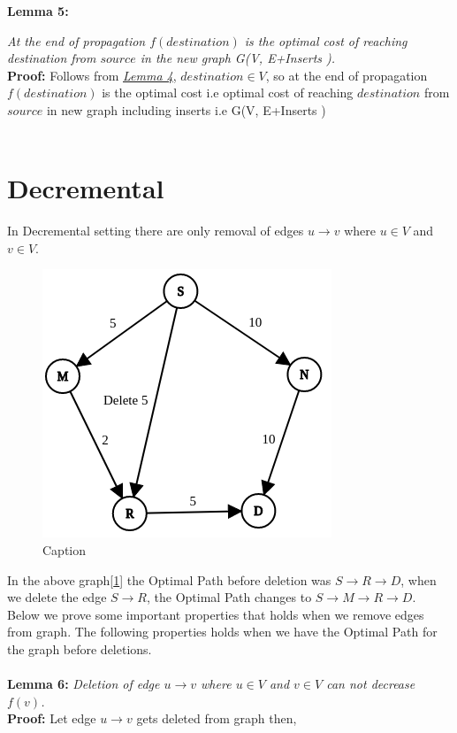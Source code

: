\documentclass[a4paper]{article}
\begin{document}
\hypertarget{Lemma 5}{\textbf{Lemma 5:}}\textit{At the end of propagation $f(destination)$ is the optimal cost of reaching destination from $source$ in the new graph G(V, E+Inserts ).}\\
\textbf{Proof:} Follows from \hyperlink{Lemma 4}{\textit{Lemma 4}}, $destination \in V$, so at the end of propagation $f(destination)$ is the optimal cost i.e optimal cost of reaching $destination$ from $source$ in new graph including inserts i.e G(V, E+Inserts )\\
\\
\section{Decremental}
In Decremental setting there are only removal of edges $u \rightarrow v$ where $u \in V$ and $v \in V$.
\begin{figure}[H]
    \centering
    \includegraphics[scale=0.4]{img/Delete2.png}
    \caption{Caption}
    \label{fig:delete_sample}
\end{figure}
In the above graph[\ref{fig:delete_sample}] the Optimal Path before deletion was $S \rightarrow R \rightarrow D$, when we delete the edge $S \rightarrow R$, the Optimal Path changes to $S \rightarrow M \rightarrow R \rightarrow D$.\\
Below we prove some important properties that holds when we remove edges from graph. The following properties holds when we have the Optimal Path for the graph before deletions.\\
\\
\hypertarget{Lemma 6}{\textbf{Lemma 6:}} \textit{Deletion of edge $ u \rightarrow v$ where $u \in V$ and $v \in V$ can not decrease $f(v)$.}\\
\textbf{Proof:} Let edge $ u \rightarrow v$ gets deleted from graph then,
\end{document}

